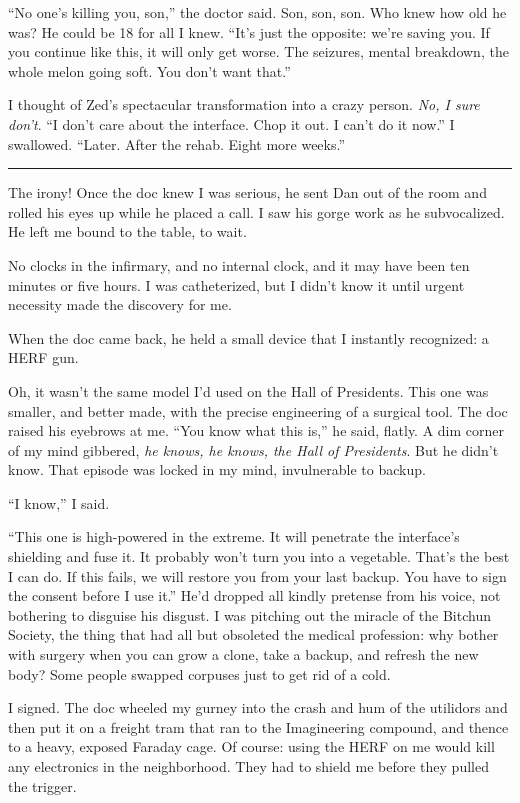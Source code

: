 “No one's killing you, son,” the doctor said. Son, son, son. Who
knew how old he was? He could be 18 for all I knew. “It's just the
opposite: we're saving you. If you continue like this, it will only
get worse. The seizures, mental breakdown, the whole melon going
soft. You don't want that.”

I thought of Zed's spectacular transformation into a crazy person.
\emph{No, I sure don't}. “I don't care about the interface. Chop it
out. I can't do it now.” I swallowed. “Later. After the rehab.
Eight more weeks.”

\begin{center}\rule{1in}{0.4pt}\end{center}

The irony! Once the doc knew I was serious, he sent Dan out of the
room and rolled his eyes up while he placed a call. I saw his gorge
work as he subvocalized. He left me bound to the table, to wait.

No clocks in the infirmary, and no internal clock, and it may have
been ten minutes or five hours. I was catheterized, but I didn't
know it until urgent necessity made the discovery for me.

When the doc came back, he held a small device that I instantly
recognized: a HERF gun.

Oh, it wasn't the same model I'd used on the Hall of Presidents.
This one was smaller, and better made, with the precise engineering
of a surgical tool. The doc raised his eyebrows at me. “You know
what this is,” he said, flatly. A dim corner of my mind gibbered,
\emph{he knows, he knows, the Hall of Presidents}. But he didn't
know. That episode was locked in my mind, invulnerable to backup.

“I know,” I said.

“This one is high-powered in the extreme. It will penetrate the
interface's shielding and fuse it. It probably won't turn you into
a vegetable. That's the best I can do. If this fails, we will
restore you from your last backup. You have to sign the consent
before I use it.” He'd dropped all kindly pretense from his voice,
not bothering to disguise his disgust. I was pitching out the
miracle of the Bitchun Society, the thing that had all but
obsoleted the medical profession: why bother with surgery when you
can grow a clone, take a backup, and refresh the new body? Some
people swapped corpuses just to get rid of a cold.

I signed. The doc wheeled my gurney into the crash and hum of the
utilidors and then put it on a freight tram that ran to the
Imagineering compound, and thence to a heavy, exposed Faraday cage.
Of course: using the HERF on me would kill any electronics in the
neighborhood. They had to shield me before they pulled the
trigger.

